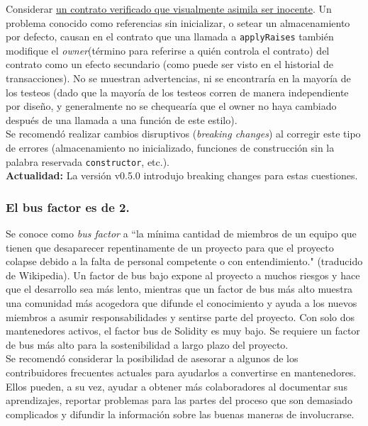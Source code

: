 Considerar \underline{un contrato verificado que visualmente asimila ser inocente}\cite{EtherscanRopstenContratoMalicioso}. Un problema conocido como referencias sin inicializar, o setear un almacenamiento por defecto, causan en el contrato que una llamada a \verb|applyRaises| también modifique el \textit{owner}(término para referirse a quién controla el contrato) del contrato como un efecto secundario (como puede ser visto en el historial de transacciones). No se muestran advertencias, ni se encontraría en la mayoría de los testeos (dado que la mayoría de los testeos corren de manera independiente por diseño, y generalmente no se chequearía que el owner no haya cambiado después de una llamada a una función de este estilo).\\

Se recomendó realizar cambios disruptivos (\textit{breaking changes}) al corregir este tipo de errores (almacenamiento no inicializado, funciones de construcción sin la palabra reservada \verb|constructor|, etc.).\\

\textbf{Actualidad:} La versión v0.5.0 introdujo breaking changes para estas cuestiones.

\subsubsection{El bus factor es de 2.}
Se conoce como \textit{bus factor} a ``la mínima cantidad de miembros de un equipo que tienen que desaparecer repentinamente de un proyecto para que el proyecto colapse debido a la falta de personal competente o con entendimiento." (traducido de Wikipedia\cite{WikiBusFactor}). Un factor de bus bajo expone al proyecto a muchos riesgos y hace que el desarrollo sea más lento, mientras que un factor de bus más alto muestra una comunidad más acogedora que difunde el conocimiento y ayuda a los nuevos miembros a asumir responsabilidades y sentirse parte del proyecto. Con solo dos mantenedores activos\cite{GHContributors}, el factor bus de Solidity es muy bajo. Se requiere un factor de bus más alto para la sostenibilidad a largo plazo del proyecto.\\

Se recomendó considerar la posibilidad de asesorar a algunos de los contribuidores frecuentes actuales para ayudarlos a convertirse en mantenedores. Ellos pueden, a su vez, ayudar a obtener más colaboradores al documentar sus aprendizajes, reportar problemas para las partes del proceso que son demasiado complicados y difundir la información sobre las buenas maneras de involucrarse.\\

